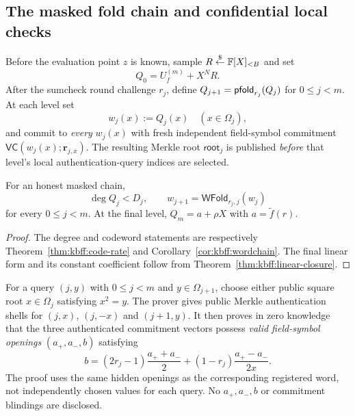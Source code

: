 \subsection{The masked fold chain and confidential local checks}\label{sec:full:fold-oracle}

\begin{definition}\label{def:full:masked-oracles}
Before the evaluation point $z$ is known, sample
$R\overset{\$}{\leftarrow}\mathbb{F}[X]_{<B}$ and set
\[
 Q_0=U_f^{(m)}+X^NR.
\]
After the sumcheck round challenge $r_j$,
define $Q_{j+1}=\mathsf{pfold}_{r_j}(Q_j)$
for $0\le j<m$. At each level set
\[
 w_j(x):=Q_j(x)\quad(x\in\Omega_j),
\]
and commit to \emph{every} $w_j(x)$ with
fresh independent field-symbol commitment
$\mathsf{VC}(w_j(x);\mathbf r_{j,x})$.
The resulting Merkle root $\mathsf{root}_j$
is published \emph{before} that level's
local authentication-query indices
are selected.
\end{definition}

\begin{lemma}\label{lem:full:fold-invariants}
For an honest masked chain,
\[
 \deg Q_j<D_j,\qquad
 w_{j+1}=\mathsf{WFold}_{r_j,j}(w_j)
\]
for every $0\le j<m$.
At the final level,
$Q_m=a+\rho X$ with
$a=\widetilde f(r)$.
\end{lemma}
\begin{proof}
The degree and codeword statements
are respectively
Theorem~\ref{thm:kbff:code-rate}
and Corollary~\ref{cor:kbff:wordchain}.
The final linear form and its
constant coefficient follow from
Theorem~\ref{thm:kbff:linear-closure}.
\end{proof}

\begin{definition}\label{def:full:fold-query}
For a query $(j,y)$ with
$0\le j<m$ and $y\in\Omega_{j+1}$,
choose either public square root
$x\in\Omega_j$ satisfying $x^2=y$.
The prover gives public Merkle
authentication shells for
$(j,x)$, $(j,-x)$ and $(j+1,y)$.
It then proves in zero knowledge
that the three authenticated
commitment vectors possess
\emph{valid field-symbol openings}
$(a_+,a_-,b)$ satisfying
\[
 \boxed{
 b=(2r_j-1)\frac{a_++a_-}{2}
   +(1-r_j)\frac{a_+-a_-}{2x}.}
\]
The proof uses the same hidden
openings as the corresponding
registered word, not independently
chosen values for each query.
No $a_+,a_-,b$ or commitment
blindings are disclosed.
\end{definition}

